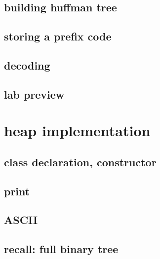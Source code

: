 


\subsection{building huffman tree}





\subsection{storing a prefix code}



\subsection{decoding}



\subsection{lab preview}



\section{heap implementation}



\subsection{class declaration, constructor}




\subsection{print}


\subsection{ASCII}

\subsection{recall: full binary tree}


